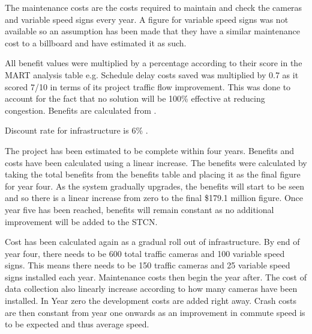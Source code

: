 \documentclass[twoside, a4paper, 11pt]{article}
\begin{document}
The maintenance costs are the costs required to maintain and check the cameras and variable speed signs every year. A figure for variable speed signs was not available so an assumption has been made that they have a similar maintenance cost to a billboard and have estimated it as such.

All benefit values were multiplied by a percentage according to their score in the MART analysis table e.g. Schedule delay costs saved was multiplied by 0.7 as it scored 7/10 in terms of its project traffic flow improvement. This was done to account for the fact that no solution will be 100\% effective at reducing congestion. Benefits are calculated from \cite[p.~45]{wallis15}.

Discount rate for infrastructure is 6\% \citep{treasury16}.

The project has been estimated to be complete within four years. Benefits and costs have been calculated using a linear increase. The benefits were calculated by taking the total benefits from the benefits table and placing it as the final figure for year four. As the system gradually upgrades, the benefits will start to be seen and so there is a linear increase from zero to the final \$179.1 million figure. Once year five has been reached, benefits will remain constant as no additional improvement will be added to the STCN.

Cost has been calculated again as a gradual roll out of infrastructure. By end of year four, there needs to be 600 total traffic cameras and 100 variable speed signs. This means there needs to be 150 traffic cameras and 25 variable speed signs installed each year. Maintenance costs then begin the year after. The cost of data collection also linearly increase according to how many cameras have been installed. In Year zero the development costs are added right away. Crash costs are then constant from year one onwards as an improvement in commute speed is to be expected and thus average speed.
\end{document}
